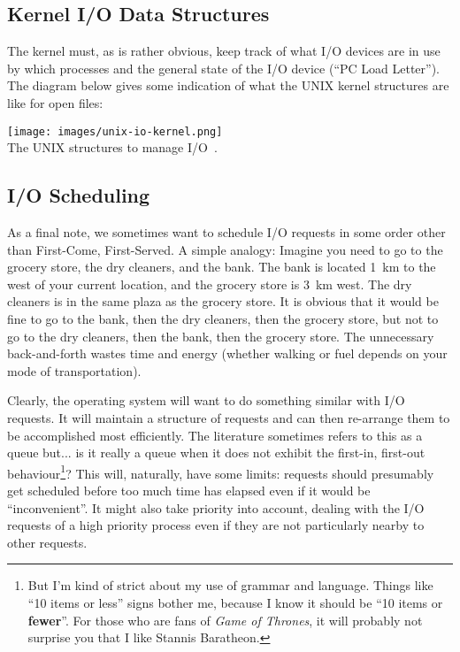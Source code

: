 \subsection*{Kernel I/O Data Structures}
The kernel must, as is rather obvious, keep track of what I/O devices are in use by which processes and the general state of the I/O device (``PC Load Letter''). The diagram below gives some indication of what the UNIX kernel structures are like for open files:

\begin{center}
	\texttt{[image: images/unix-io-kernel.png]}\\
	The UNIX structures to manage I/O~\cite{osc}.
\end{center}

\subsection*{I/O Scheduling}

As a final note, we sometimes want to schedule I/O requests in some order other than First-Come, First-Served. A simple analogy: Imagine you need to go to the grocery store, the dry cleaners, and the bank. The bank is located 1~km to the west of your current location, and the grocery store is 3~km west. The dry cleaners is in the same plaza as the grocery store. It is obvious that it would be fine to go to the bank, then the dry cleaners, then the grocery store, but not to go to the dry cleaners, then the bank, then the grocery store. The unnecessary back-and-forth wastes time and energy (whether walking or fuel depends on your mode of transportation).

Clearly, the operating system will want to do something similar with I/O requests. It will maintain a structure of requests and can then re-arrange them to be accomplished most efficiently. The literature sometimes refers to this as a queue but... is it really a queue when it does not exhibit the first-in, first-out behaviour\footnote{But I'm kind of strict about my use of grammar and language. Things like ``10 items or less'' signs bother me, because I know it should be ``10 items or \textbf{fewer}''. For those who are fans of \textit{Game of Thrones}, it will probably not surprise you that I like Stannis Baratheon.}? This will, naturally, have some limits: requests should presumably get scheduled before too much time has elapsed even if it would be ``inconvenient''. It might also take priority into account, dealing with the I/O requests of a high priority process even if they are not particularly nearby to other requests. 

